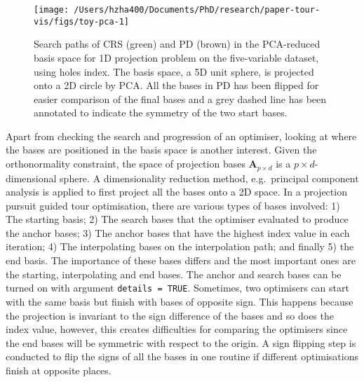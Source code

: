 \begin{Schunk}
\begin{figure}

{\centering \texttt{[image: /Users/hzha400/Documents/PhD/research/paper-tour-vis/figs/toy-pca-1]} 

}

\caption[Search paths of CRS (green) and PD (brown) in the PCA-reduced basis space for 1D projection problem on the five-variable dataset,  using holes index]{Search paths of CRS (green) and PD (brown) in the PCA-reduced basis space for 1D projection problem on the five-variable dataset,  using holes index. The basis space, a 5D unit sphere, is projected onto a 2D circle by PCA. All the bases in PD has been flipped for easier comparison of the final bases and a grey dashed line has been annotated to indicate the symmetry of the two start bases.}\label{fig:toy-pca}
\end{figure}
\end{Schunk}

Apart from checking the search and progression of an optimiser, looking
at where the bases are positioned in the basis space is another
interest. Given the orthonormality constraint, the space of projection
bases \(\mathbf{A}_{p \times d}\) is a \(p \times d\)-dimensional
sphere. A dimensionality reduction method, e.g.~principal component
analysis is applied to first project all the bases onto a 2D space. In a
projection pursuit guided tour optimisation, there are various types of
bases involved: 1) The starting basis; 2) The search bases that the
optimiser evaluated to produce the anchor bases; 3) The anchor bases
that have the highest index value in each iteration; 4) The
interpolating bases on the interpolation path; and finally 5) the end
basis. The importance of these bases differs and the most important ones
are the starting, interpolating and end bases. The anchor and search
bases can be turned on with argument \texttt{details\ =\ TRUE}.
Sometimes, two optimisers can start with the same basis but finish with
bases of opposite sign. This happens because the projection is invariant
to the sign difference of the bases and so does the index value,
however, this creates difficulties for comparing the optimisers since
the end bases will be symmetric with respect to the origin. A sign
flipping step is conducted to flip the signs of all the bases in one
routine if different optimisations finish at opposite places.

